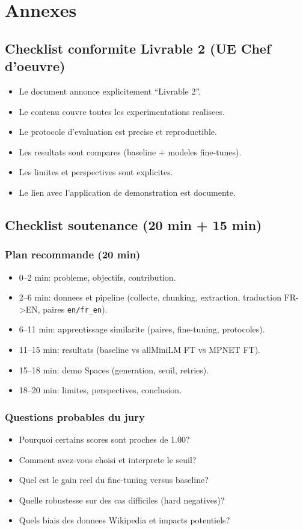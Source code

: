 ﻿\chapter{Annexes}

\section{Checklist conformite Livrable 2 (UE Chef d'oeuvre)}
\begin{itemize}[leftmargin=2em]
  \item Le document annonce explicitement ``Livrable 2''.
  \item Le contenu couvre toutes les experimentations realisees.
  \item Le protocole d'evaluation est precise et reproductible.
  \item Les resultats sont compares (baseline + modeles fine-tunes).
  \item Les limites et perspectives sont explicites.
  \item Le lien avec l'application de demonstration est documente.
\end{itemize}

\section{Checklist soutenance (20 min + 15 min)}
\subsection*{Plan recommande (20 min)}
\begin{itemize}[leftmargin=2em]
  \item 0--2 min: probleme, objectifs, contribution.
  \item 2--6 min: donnees et pipeline (collecte, chunking, extraction, traduction FR->EN, paires \texttt{en/fr\_en}).
  \item 6--11 min: apprentissage similarite (paires, fine-tuning, protocoles).
  \item 11--15 min: resultats (baseline vs allMiniLM FT vs MPNET FT).
  \item 15--18 min: demo Spaces (generation, seuil, retries).
  \item 18--20 min: limites, perspectives, conclusion.
\end{itemize}

\subsection*{Questions probables du jury}
\begin{itemize}[leftmargin=2em]
  \item Pourquoi certains scores sont proches de 1.00?
  \item Comment avez-vous choisi et interprete le seuil?
  \item Quel est le gain reel du fine-tuning versus baseline?
  \item Quelle robustesse sur des cas difficiles (hard negatives)?
  \item Quels biais des donnees Wikipedia et impacts potentiels?
\end{itemize}

